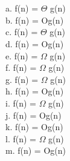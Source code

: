 \documentclass[12pt]{article}
\begin{document}
\maketitle

\section{}

a. f(n) = \ensuremath{\Theta} g(n)\\
b. f(n) = Og(n)\\
c. f(n) = \ensuremath{\Theta}  g(n)\\
d. f(n) = Og(n)\\
e. f(n) = \ensuremath{\Omega} g(n)\\
f. f(n) = \ensuremath{\Omega} g(n)\\
g. f(n) = \ensuremath{\Omega} g(n)\\
h. f(n) = Og(n)\\
i. f(n) = \ensuremath{\Omega} g(n)\\
j. f(n) = Og(n)\\
k. f(n) = Og(n)\\
l. f(n) = \ensuremath{\Omega} g(n)\\
m. f(n) = Og(n)\\
\pagebreak[4]
\end{document}
